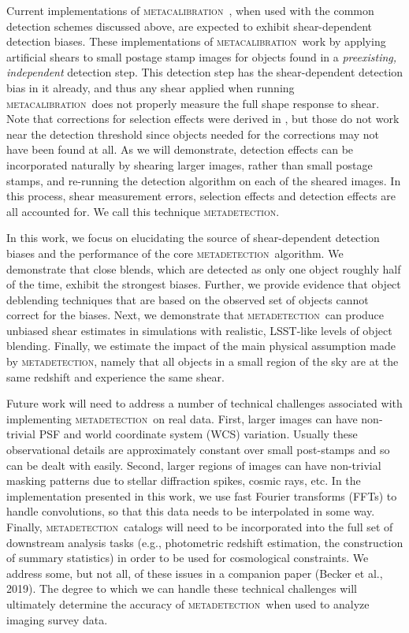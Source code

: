 \documentclass[fleqn,useAMS,usenatbib]{mnras}
\newcommand{\mcal}{\textsc{metacalibration}}
\newcommand{\mdet}{\textsc{metadetection}}
\begin{document}
Current implementations of \mcal\ \citep[e.g.,][]{HuffMcal2017,SheldonMcal2017},
when used with the common detection schemes discussed above, are expected to
exhibit shear-dependent detection biases. These implementations of \mcal\ work
by applying artificial shears to small postage stamp images for objects found in
a {\em preexisting, independent} detection step. This detection step has the
shear-dependent detection bias in it already, and thus any shear applied when
running \mcal\ does not properly measure the full shape response to shear. Note
that corrections for selection effects were derived in \cite{SheldonMcal2017},
but those do not work near the detection threshold since objects needed for the
corrections may not have been found at all. As we will demonstrate, detection
effects can be incorporated naturally by shearing larger images, rather than
small postage stamps, and re-running the detection algorithm on each of the
sheared images. In this process, shear measurement errors, selection effects and
detection effects are all accounted for. We call this technique \mdet.

In this work, we focus on elucidating the source of shear-dependent detection
biases and the performance of the core \mdet\ algorithm. We demonstrate that
close blends, which are detected as only one object roughly half of the time,
exhibit the strongest biases. Further, we provide evidence that object
deblending techniques that are based on the observed set of objects cannot
correct for the biases. Next, we demonstrate that \mdet\ can produce unbiased
shear estimates in simulations with realistic, LSST-like levels of object
blending. Finally, we estimate the impact of the main physical assumption
made by \mdet, namely that all objects in a small region of the sky are at the
same redshift and experience the same shear.

Future work will need to address a number of technical challenges associated
with implementing \mdet\ on real data. First, larger images can have non-trivial
PSF and world coordinate system (WCS) variation. Usually these observational
details are approximately constant over small post-stamps and so can be dealt
with easily. Second, larger regions of images can have non-trivial masking
patterns due to stellar diffraction spikes, cosmic rays, etc. In the
implementation presented in this work, we use fast Fourier transforms (FFTs) to
handle convolutions, so that this data needs to be interpolated in some way.
Finally, \mdet\ catalogs will need to be incorporated into the full set of
downstream analysis tasks (e.g., photometric redshift estimation, the
construction of summary statistics) in order to be used for cosmological
constraints. We address some, but not all, of these issues in a companion paper
(Becker et al., 2019). The degree to which we can handle these technical
challenges will ultimately determine the accuracy of \mdet\ when used to analyze
imaging survey data.
\end{document}

